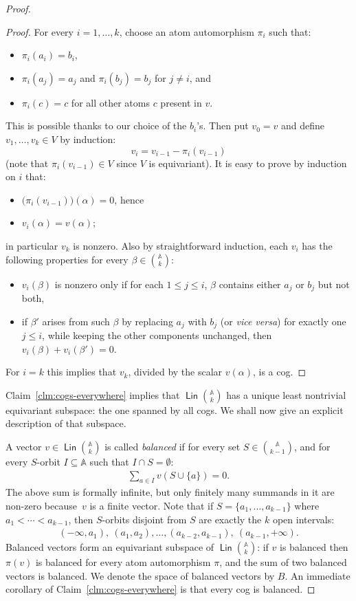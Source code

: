 \documentclass{theoretics}
\newcommand{\atoms}{\mathbb A}
\DeclareMathOperator{\lin}{\mathsf{Lin}}
\begin{document}
\begin{proof}
\begin{proof}
For every $i=1,\ldots,k$, choose an atom automorphism $\pi_i$ such that:
\begin{itemize}
\item $\pi_i(a_i)=b_i$, 
\item $\pi_i(a_j)=a_j$ and $\pi_i(b_j)=b_j$ for $j\neq i$, and
\item $\pi_i(c)=c$ for all other atoms $c$ present in $v$.
\end{itemize}
This is possible thanks to our choice of the $b_i$'s. Then put $v_0=v$ and define  $v_1,\ldots,v_k\in V$ by induction:
\[
	v_i = v_{i-1} - \pi_i(v_{i-1}) 
\]
(note that $\pi_i(v_{i-1})\in V$ since $V$ is equivariant). It is easy to prove by induction on $i$ that: 
\begin{itemize}
\item $\big(\pi_i(v_{i-1})\big)(\alpha)=0$, hence
\item $v_{i}(\alpha) = v(\alpha)$;
\end{itemize}
in particular $v_k$ is nonzero.
Also by straightforward induction, each $v_i$ has the following properties for every $\beta\in{\atoms\choose k}$:
\begin{itemize}
\item $v_i(\beta)$ is nonzero only if for each $1\leq j\leq i$, $\beta$ contains either $a_j$ or  $b_j$ but not both,
\item if $\beta'$ arises from such $\beta$ by replacing $a_j$ with $b_j$ (or {\em vice versa}) for exactly one $j\leq i$, while keeping the other components unchanged, then $v_i(\beta)+v_i(\beta')=0$.
\end{itemize}
For $i=k$ this implies that $v_k$, divided by the scalar $v(\alpha)$, is a cog.
\end{proof}

Claim~\ref{clm:cogs-everywhere} implies that $\lin{\atoms\choose k}$ has a unique least nontrivial equivariant subspace: the one spanned by all cogs. We shall now give an explicit description of that subspace.

A vector $v\in\lin{\atoms\choose k}$ is called {\em balanced} if for every set $S\in{\atoms\choose{k-1}}$, and for every $S$-orbit $I\subseteq\atoms$ such that $I\cap S=\emptyset$:
\begin{align}\label{balanced}
	\textstyle \sum_{a\in I}v(S\cup\{a\})=0.
\end{align}
The above sum is formally infinite, but only finitely many summands in it are non-zero because~$v$ is a finite vector.
Note that if $S=\{a_1,\ldots,a_{k-1}\}$ where $a_1<\cdots<a_{k-1}$, then $S$-orbits disjoint from $S$ are exactly the $k$ open intervals:
\begin{align}\label{orbits}
	(-\infty,a_1),\ (a_1,a_2),\ldots,(a_{k-2},a_{k-1}),\ (a_{k-1},+\infty).
\end{align}
Balanced vectors form an equivariant subspace of $\lin{\atoms\choose k}$: if $v$ is balanced then $\pi(v)$ is balanced for every atom automorphism $\pi$, and the sum of two balanced vectors is balanced. We denote the space of balanced vectors by $B$. An immediate corollary of Claim~\ref{clm:cogs-everywhere} is that every cog is balanced.


\end{proof}
\end{document}
